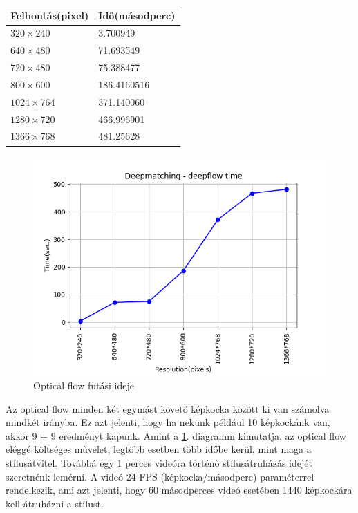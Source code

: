 \documentclass[12pt, a4paper, oneside]{book}
\theoremstyle{tetel}
\begin{document}
\begin{center}
	\begin{tabular}{ | l | l |}
		\hline
		Felbontás(pixel) & Idő(másodperc) \\ \hline
		$320 \times $240 & 3.700949 \\ \hline
		$640 \times $480 & 71.693549 \\ \hline
		$720 \times $480 & 75.388477 \\ \hline
		$800 \times $600 & 186.4160516 \\ \hline
		$1024 \times $764 & 371.140060 \\ \hline
		$1280 \times $720 & 466.996901 \\ \hline
		$1366 \times $768 & 481.25628 \\ \hline
	\end{tabular}
\end{center}

\begin{figure}[!htbp]
\begin{center}
	\includegraphics[scale=0.8]{deepmatching_deeplfow.png}
	\caption{Optical flow futási ideje}
	\label{deepmatching_deepflow}
\end{center}
\end{figure}

Az optical flow minden két egymást követő képkocka között ki van számolva mindkét irányba. Ez azt jelenti, hogy ha nekünk például 10 képkockánk van, akkor 9 + 9 eredményt kapunk. Amint a \ref{deepmatching_deepflow}. diagramm kimutatja, az optical flow eléggé költséges művelet, legtöbb esetben több időbe kerül, mint maga a stílusátvitel. 
\newline
\indent
Továbbá egy 1 perces videóra történő stílusátruházás idejét szeretnénk lemérni. A videó 24 FPS (képkocka/másodperc) paraméterrel rendelkezik, ami azt jelenti, hogy 60 másodperces videó esetében 1440 képkockára kell átruházni a stílust.
\end{document}
